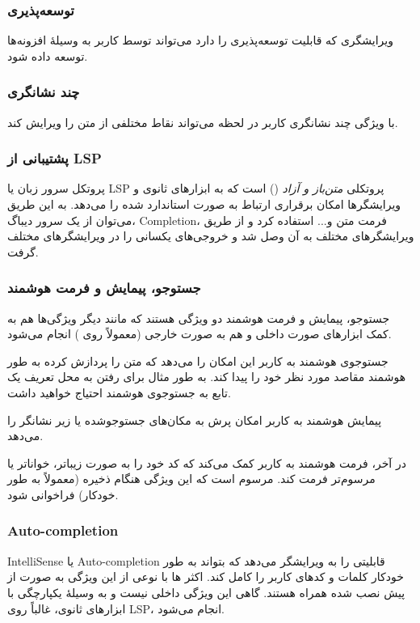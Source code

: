 \documentclass[a4paper]{article}
\begin{document}
\subsubsection{توسعه‌پذیری}
ویرایشگری که قابلیت توسعه‌پذیری را دارد می‌تواند توسط کاربر به وسیلهٔ افزونه‌ها توسعه داده شود.

\subsubsection{چند نشانگری}
با ویژگی چند نشانگری کاربر در لحظه می‌تواند نقاط مختلفی از متن را ویرایش کند.

\subsubsection{پشتیبانی از LSP}
پروتکل سرور زبان یا LSP پروتکلی \textit{متن‌باز و آزاد} () است که به ابزارهای ثانوی
و ویرایشگرها امکان برقراری ارتباط به صورت استاندارد شده را می‌دهد. به این طریق
می‌توان از یک سرور دیباگ، Completion، فرمت متن و... استفاده کرد و از طریق ویرایشگرهای
مختلف به آن وصل شد و خروجی‌های یکسانی را در ویرایشگرهای مختلف گرفت.

\subsubsection{جستوجو، پیمایش و فرمت هوشمند}
جستوجو، پیمایش و فرمت هوشمند دو ویژگی هستند که مانند دیگر ویژگی‌ها هم به کمک
ابزارهای صورت داخلی و هم به صورت خارجی (معمولاً روی ) انجام می‌شود.

جستوجوی هوشمند به کاربر این امکان را می‌دهد که متن را پردازش کرده به طور هوشمند
مقاصد مورد نظر خود را پیدا کند. به طور مثال برای رفتن به محل تعریف یک تابع به جستوجوی هوشمند احتیاج خواهید داشت.

پیمایش هوشمند به کاربر امکان پرش به مکان‌های جستوجوشده یا زیر نشانگر را می‌دهد.

در آخر، فرمت هوشمند به کاربر کمک می‌کند که کد خود را به صورت زیباتر، خواناتر یا
مرسوم‌تر فرمت کند. مرسوم است که این ویژگی هنگام ذخیره (معمولاً به طور خودکار) فراخوانی شود.

\subsubsection{Auto-completion}
IntelliSense یا Auto-completion قابلیتی را به ویرایشگر می‌دهد که بتواند به طور خودکار کلمات و کدهای
کاربر را کامل کند. اکثر ها با نوعی از این ویژگی به صورت از پیش نصب شده
همراه هستند. گاهی این ویژگی داخلی نیست و به وسیلهٔ یکپارچگی با ابزارهای ثانوی، غالباً روی LSP، انجام می‌شود.
\end{document}
